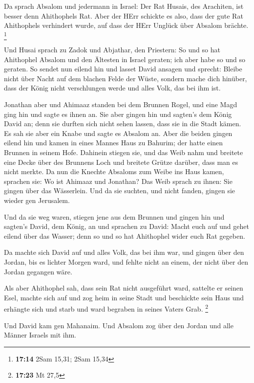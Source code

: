  Da sprach Absalom und jedermann in Israel: Der Rat Husais,
des Arachiten, ist besser denn Ahithophels Rat. Aber der HErr schickte
es also, dass der gute Rat Ahithophels verhindert wurde, auf dass der
HErr Unglück über Absalom brächte. \footnote{\textbf{17:14} 2Sam 15,31;
  2Sam 15,34}

 Und Husai sprach zu Zadok und Abjathar, den Priestern: So
und so hat Ahithophel Absalom und den Ältesten in Israel geraten; ich
aber habe so und so geraten.  So sendet nun eilend hin und
lasset David ansagen und sprecht: Bleibe nicht über Nacht auf dem
blachen Felde der Wüste, sondern mache dich hinüber, dass der König
nicht verschlungen werde und alles Volk, das bei ihm ist.

 Jonathan aber und Ahimaaz standen bei dem Brunnen Rogel,
und eine Magd ging hin und sagte es ihnen an. Sie aber gingen hin und
sagten's dem König David an; denn sie durften sich nicht sehen lassen,
dass sie in die Stadt kämen.  Es sah sie aber ein Knabe und
sagte es Absalom an. Aber die beiden gingen eilend hin und kamen in
eines Mannes Haus zu Bahurim; der hatte einen Brunnen in seinem Hofe.
Dahinein stiegen sie,  und das Weib nahm und breitete eine
Decke über des Brunnens Loch und breitete Grütze darüber, dass man es
nicht merkte.  Da nun die Knechte Absaloms zum Weibe ins
Haus kamen, sprachen sie: Wo ist Ahimaaz und Jonathan? Das Weib sprach
zu ihnen: Sie gingen über das Wässerlein. Und da sie suchten, und nicht
fanden, gingen sie wieder gen Jerusalem.

 Und da sie weg waren, stiegen jene aus dem Brunnen und
gingen hin und sagten's David, dem König, an und sprachen zu David:
Macht euch auf und gehet eilend über das Wasser; denn so und so hat
Ahithophel wider euch Rat gegeben.

 Da machte sich David auf und alles Volk, das bei ihm war,
und gingen über den Jordan, bis es lichter Morgen ward, und fehlte nicht
an einem, der nicht über den Jordan gegangen wäre.

 Als aber Ahithophel sah, dass sein Rat nicht ausgeführt
ward, sattelte er seinen Esel, machte sich auf und zog heim in seine
Stadt und beschickte sein Haus und erhängte sich und starb und ward
begraben in seines Vaters Grab. \footnote{\textbf{17:23} Mt 27,5}

 Und David kam gen Mahanaim. Und Absalom zog über den
Jordan und alle Männer Israels mit ihm.

